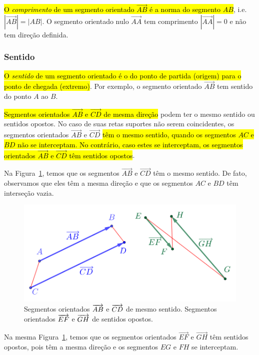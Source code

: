   \hl{O \emph{comprimento} de um segmento orientado $\overrightarrow{AB}$ é a norma do segmento $AB$}, i.e. $\left|\overrightarrow{AB}\right| = |AB|$. O segmento orientado nulo $\overrightarrow{AA}$ tem comprimento $\left|\overrightarrow{AA}\right|=0$ e não tem direção definida.

\subsubsection{Sentido}


\hl{O \emph{sentido} de um segmento orientado é o do ponto de partida (origem) para o ponto de chegada (extremo)}. Por exemplo, o segmento orientado $\overrightarrow{AB}$ tem sentido do ponto $A$ ao $B$.

\hl{Segmentos orientados $\overrightarrow{AB}$ e $\overrightarrow{CD}$ de mesma direção} podem ter o mesmo sentido ou sentidos opostos. No caso de suas retas suportes não serem coincidentes, os segmentos orientados $\overrightarrow{AB}$ e $\overrightarrow{CD}$ \hl{têm o mesmo sentido, quando os segmentos $AC$ e $BD$ não se interceptam. No contrário, caso estes se interceptam, os segmentos orientados $\overrightarrow{AB}$ e $\overrightarrow{CD}$ têm sentidos opostos}. 

\begin{ex}
  Na Figura~\ref{cap_vetor_sec_segorien:fig:segorien_sentido}, temos que os segmentos $\overrightarrow{AB}$ e $\overrightarrow{CD}$ têm o mesmo sentido. De fato, observamos que eles têm a mesma direção e que os segmentos $AC$ e $BD$ têm interseção vazia.

\begin{figure}[h]
  \centering
  \includegraphics{./cap_vetor/dados/fig_segorien_sentido/fig.png}
  \caption{Segmentos orientados $\protect\overrightarrow{AB}$ e $\protect\overrightarrow{CD}$ de mesmo sentido. Segmentos orientados $\protect\overrightarrow{EF}$ e $\protect\overrightarrow{GH}$ de sentidos opostos.}
  \label{cap_vetor_sec_segorien:fig:segorien_sentido}
\end{figure}

Na mesma Figura~\ref{cap_vetor_sec_segorien:fig:segorien_sentido}, temos que os segmentos orientados $\overrightarrow{EF}$ e $\overrightarrow{GH}$ têm sentidos opostos, pois têm a mesma direção e os segmentos $EG$ e $FH$ se interceptam. 
\end{ex}

